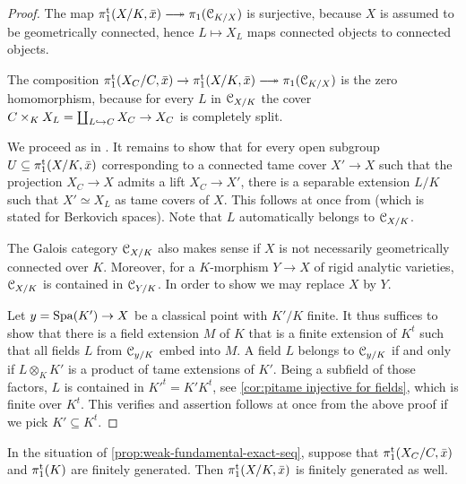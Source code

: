 \begin{proof}
    The map $\pitame(X/K,\bar x) \surj \pi_1(\cC_{K/X})$ is surjective, because $X$ is assumed to be geometrically connected, hence $L \mapsto X_L$ maps connected objects to connected objects. 

    The composition $\pitame(X_C/C, \bar x) \to \pitame(X/K,\bar x) \surj \pi_1(\cC_{K/X})$ is the zero homomorphism, because for every $L$ in ${\mathcal C}_{X/K}$ the cover $C \times_K X_L = \coprod_{L \hookrightarrow C} X_C \to X_C$ is completely split. 

    We proceed as in \cite[X]{SGA1}. It remains to show that for every open subgroup $U \subseteq \pi_1^{\mathrm{t}}(X/K,\bar x)$ corresponding to a connected tame cover $X' \to X$ such that the projection  $X_C \to X$ admits a lift $X_C \to X'$, there is a separable extension $L/K$ such that $X' \simeq X_L$ as tame covers of $X$. This follows at once from
    \cite[Proposition~2.13]{deJong95:FundamentalGroupsofAnalytic}
    (which is stated for Berkovich spaces). Note that $L$ automatically belongs to ${\mathcal C}_{X/K}$.
    
     The Galois category ${\mathcal C}_{X/K}$ also makes sense if $X$ is not necessarily geometrically connected over $K$. Moreover, for a $K$-morphism $Y \to X$ of rigid analytic varieties, ${\mathcal C}_{X/K}$ is contained in ${\mathcal C}_{Y/K}$. In order to show  we may replace $X$ by $Y$.
    
    Let $y = \operatorname{Spa}(K') \to X$ be a classical point with $K'/K$ finite. It thus suffices to show that there is a field extension $M$ of $K$ that is a finite extension of $K^t$ such that all fields $L$ from ${\mathcal C}_{y/K}$ embed into $M$. A field $L$ belongs to ${\mathcal C}_{y/K}$ if and only if $L \otimes_K K'$ is a product of tame extensions of $K'$. Being a subfield of those factors, $L$ is contained in $K'^t = K' K^t$, see  \cref{cor:pitame injective for fields}, which is finite over $K^t$. This verifies  and assertion  follows at once from the above proof if we pick $K' \subseteq K^t$.     
\end{proof}

\begin{cor} \label{cor:fg-alg-closed}
    In the situation of \cref{prop:weak-fundamental-exact-seq}, suppose that $\pi_1^{\mathrm{t}}(X_C/C,\bar x)$ and $\pi_1^{\mathrm{t}}(K)$ are finitely generated. Then $\pi_1^{\mathrm{t}}(X/K,\bar x)$ is finitely generated as well.
\end{cor}


